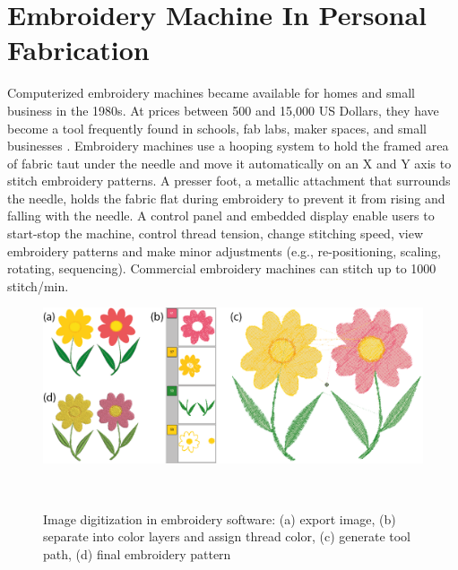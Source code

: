 \documentclass[header.tex]{subfiles}
\begin{document}







\section{Embroidery Machine In Personal Fabrication}
Computerized embroidery machines became available for homes and small business in the 1980s. At prices between 500 and 15,000 US Dollars, they have become a tool frequently found in schools, fab labs, maker spaces, and small businesses \cite{lipson2010factory}. 
Embroidery machines use a hooping system to hold the framed area of fabric taut under the needle and move it automatically on an X and Y axis to stitch embroidery patterns. A presser foot, a metallic attachment that surrounds the needle, holds the fabric flat during embroidery to prevent it from rising and falling with the needle. A control panel and embedded display enable users to start-stop the machine, control thread tension, change stitching speed, view embroidery patterns and make minor adjustments (e.g., re-positioning, scaling, rotating, sequencing). Commercial embroidery machines can stitch up to 1000 stitch/min.


 \begin{figure}
\centering
  \includegraphics[width=0.8\columnwidth]{figures/EmbroideryWorkflow}
  \caption{Image digitization in embroidery software: (a) export image, (b) separate into color layers and assign thread color, (c) generate tool path, (d) final embroidery pattern }~\label{fig:EmbroideryWorkflow}
  \vspace{-2.5em}
\end{figure}
\end{document}
